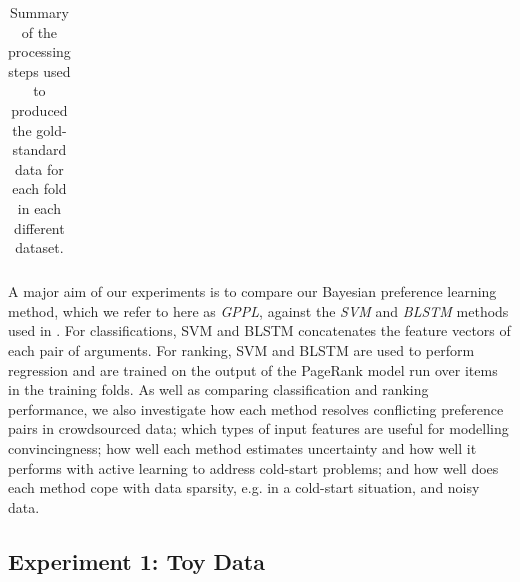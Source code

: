 \begin{table}
\begin{tabularx}{\columnwidth}{ X }
  \end{tabularx}
  \caption{\label{tab:expt_data} Summary of the processing steps used to produced the gold-standard data for each fold in each different dataset.}
\end{table}

A major aim of our experiments is to compare our Bayesian preference learning method,
which we refer to here as \emph{GPPL},
against the \emph{SVM} and \emph{BLSTM} methods used in \cite{habernal2016argument}. For classifications, 
SVM and BLSTM concatenates the feature vectors of each pair of arguments. 
For ranking, SVM and BLSTM are used to perform regression and are trained on the output of the PageRank 
model run over items in the training folds.
As well as comparing classification and ranking performance, 
we also investigate how each method resolves conflicting preference pairs in crowdsourced data;
which types of input features are useful for modelling convincingness;
how well each method estimates uncertainty and how well it performs with active learning to address cold-start problems; and how well does each method cope with data sparsity, e.g. in a cold-start situation,
 and noisy data.

\subsection{Experiment 1: Toy Data}


